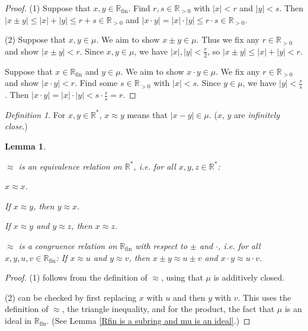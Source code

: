 \documentclass[a4paper, 11pt]{amsart}
\newtheorem{lemma}[lemma]{Lemma}
\theoremstyle{remark}
\newtheorem{definition}[definition]{Definition}
\DeclareMathOperator{\fin}{fin}
\newcommand{\RR}{\mathbb{R}}
\newenvironment{enumerate-(a)}{\begin{enumerate}[label={\upshape (\alph*)}, leftmargin=2pc]}{\end{enumerate}}
\newenvironment{enumerate-(1)}{\begin{enumerate}[label={\upshape (\arabic*)}, leftmargin=2pc]}{\end{enumerate}}
\begin{document}
\begin{proof} 
(1) 
Suppose that $x,y \in \RR_{\fin}$. 
Find $r,s \in \RR_{>0}$ with $|x|<r$ and $|y|<s$. 
Then $|x\pm y|\leq |x|+|y| \leq r+s\in \RR_{>0}$ and $|x\cdot y|=|x|\cdot |y| \leq r\cdot s \in \RR_{>0}$. 

(2) 
Suppose that $x,y\in \mu$. We aim to show $x \pm y\in \mu$. 
Thus we fix any $r\in \RR_{>0}$ and show $|x \pm y|<r$. 
Since $x,y\in \mu$, we have $|x|, |y|<\frac{r}{2}$, so $|x\pm y| \leq |x|+|y|<r$. 

Suppose that $x\in \RR_{\fin}$ and $y\in \mu$. 
We aim to show $x\cdot y\in \mu$. 
We fix any $r\in \RR_{>0}$ and show $|x\cdot y|<r$. 
Find some $s\in \RR_{>0}$ with $|x|<s$. 
Since $y\in\mu$, we have $|y|<\frac{r}{s}$. 
Then $|x\cdot y|=|x|\cdot |y| <s \cdot \frac{r}{s} =r$. 
\end{proof} 


\begin{definition} 
For $x,y\in \RR^*$, $x \approx y$ means that $|x-y|\in \mu$. ($x$, $y$ are \emph{infinitely close}.) 
\end{definition} 

\begin{lemma} \ 
\begin{enumerate-(1)} 
\item 
$\approx$ is an equivalence relation on $\RR^*$, i.e. for all $x,y,z\in \RR^*$: 
\begin{enumerate-(a)} 
\item 
$x\approx x$. 
\item 
If $x\approx y$, then $y\approx x$. 
\item 
If $x\approx y$ and $y\approx z$, then $x\approx z$. 
\end{enumerate-(a)} 
\item 
$\approx$ is a \emph{congruence relation} on $\RR_{\fin}$ with respect to $\pm$ and $\cdot$, i.e. 
for all $x,y,u,v\in \RR_{\fin}$: 
If $x\approx u$ and $y\approx v$, then $x \pm y \approx u\pm v$ and $x\cdot y \approx u \cdot v$. 
\end{enumerate-(1)} 
\end{lemma} 
\begin{proof} 
(1) follows from the definition of $\approx$, using that $\mu$ is additively closed. 

(2) can be checked by first replacing $x$ with $u$ and then $y$ with $v$. 
This uses the definition of $\approx$, the triangle inequality, and for the product, the fact that $\mu$ is an ideal in $\RR_{\fin}$. (See Lemma \ref{Rfin is a subring and mu is an ideal}.) 
\end{proof} 
\end{document}
